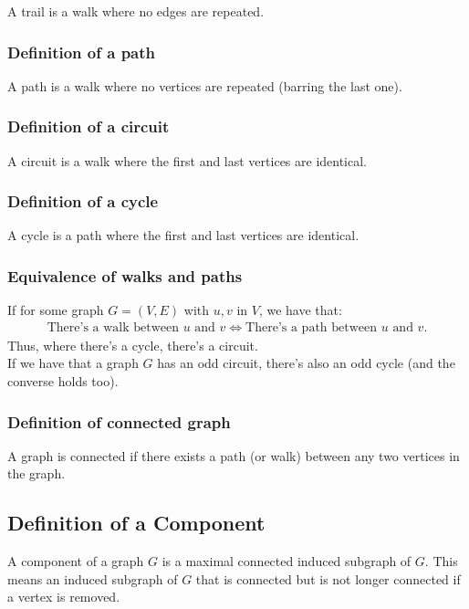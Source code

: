 \documentclass[a4paper, 12pt, twoside]{article}
\begin{document}
A trail is a walk where no edges are repeated.

\subsubsection{Definition of a path}

A path is a walk where no vertices are repeated (barring the 
last one).

\subsubsection{Definition of a circuit}

A circuit is a walk where the first and last vertices are identical.

\subsubsection{Definition of a cycle}

A cycle is a path where the first and last vertices are identical.

\subsubsection{Equivalence of walks and paths}

If for some graph $G = (V, E)$ with $u, v$ in $V$, we have that:
\begin{gather*}
  \text{There's a walk between } u \text{ and } v
  \Longleftrightarrow
  \text{There's a path between } u \text{ and } v.
\end{gather*} Thus, where there's a cycle, there's a circuit.
\\[\baselineskip]
If we have that a graph $G$ has an odd circuit, there's also
an odd cycle (and the converse holds too).

\subsubsection{Definition of connected graph}

A graph is connected if there exists a path (or walk) 
between any two vertices in the graph.

\subsection{Definition of a Component}

A component of a graph $G$ is a maximal connected 
induced subgraph of $G$. This means an induced subgraph of $G$
that is connected but is not longer connected if a vertex is
removed.
\end{document}
